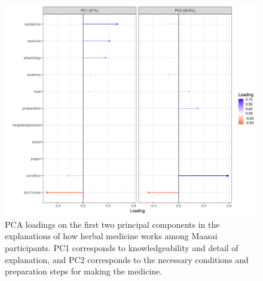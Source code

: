 \documentclass[
]{article}
\begin{document}
\begin{figure}[p]

{\centering \includegraphics{supplementary_files/figure-latex/pcaExplain-1} 

}

\caption{PCA loadings on the first two principal components in the explanations of how herbal medicine works among Maasai participants. PC1 corresponds to knowledgeability and detail of explanation, and PC2 corresponds to the necessary conditions and preparation steps for making the medicine.}\label{fig:pcaExplain}
\end{figure}
\end{document}
